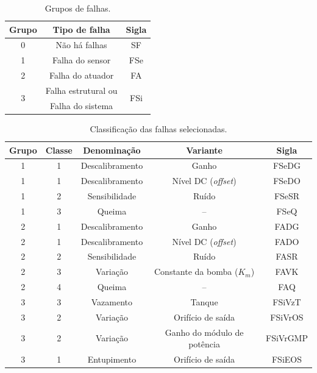 \begin{table}[!htb]
\small
\centering
\caption{Grupos de falhas.}
\label{tab:grupos_falhas}
\vspace{0.25cm}
\begin{tabular}{|c|c|c|}
\hline
{\bf Grupo} & {\bf Tipo de falha} & {\bf Sigla}\\
\hline
\hline
0 & Não há falhas & SF\\
\hline
1 & Falha do sensor & FSe\\
\hline
2 & Falha do atuador & FA\\
\hline
\multirow{2}{*}{3} & 
Falha estrutural ou & 
\multirow{2}{*}{FSi}\\
&
Falha do sistema & 
\\
\hline
\end{tabular}
\end{table}

\begin{table}[!htb]
\small
\centering
\caption{Classificação das falhas selecionadas.}
\label{tab:classificacao_falhas}
\vspace{0.25cm}
\begin{tabular}{|c|c|c|c|c|}
\hline
{\bf Grupo} & {\bf Classe} & {\bf Denominação} & {\bf Variante} & {\bf Sigla}\\
\hline
\hline
1 & 1 & Descalibramento & Ganho & FSeDG\\
\hline
1 & 1 & Descalibramento & Nível DC ({\it offset}) & FSeDO\\
\hline
1 & 2 & Sensibilidade & Ruído & FSeSR\\
\hline
1 & 3 & Queima & -- & FSeQ\\
\hline
\hline
2 & 1 & Descalibramento & Ganho & FADG\\
\hline
2 & 1 & Descalibramento & Nível DC ({\it offset}) & FADO\\
\hline
2 & 2 & Sensibilidade & Ruído & FASR\\
\hline
2 & 3 & Variação & Constante da bomba ($K_m$) & FAVK\\
\hline
2 & 4 & Queima & -- & FAQ\\
\hline
\hline
3 & 3 & Vazamento & Tanque & FSiVzT\\
\hline
3 & 2 & Variação & Orifício de saída & FSiVrOS\\
\hline
3 & 2 & Variação & Ganho do módulo de potência & FSiVrGMP\\
\hline
3 & 1 & Entupimento & Orifício de saída & FSiEOS\\
\hline
\end{tabular}
\end{table}

